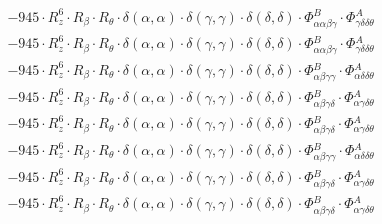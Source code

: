 \documentclass{article}
\begin{document}
\begin{subequations}
\begin{gather}
\begin{array}{c}
 \\[0.2em] 		 - 945 \cdot R_{z}^{6} \cdot R_{\beta{}} \cdot R_{\theta{}} \cdot \delta{}\left(\alpha{}, \alpha{}\right) \cdot \delta{}\left(\gamma{}, \gamma{}\right) \cdot \delta{}\left(\delta{}, \delta{}\right) \cdot \Phi{}^{B}_{\alpha{}\alpha{}\beta{}\gamma{}} \cdot \Phi{}^{A}_{\gamma{}\delta{}\delta{}\theta{}} 
 \\[0.2em] 		 - 945 \cdot R_{z}^{6} \cdot R_{\beta{}} \cdot R_{\theta{}} \cdot \delta{}\left(\alpha{}, \alpha{}\right) \cdot \delta{}\left(\gamma{}, \gamma{}\right) \cdot \delta{}\left(\delta{}, \delta{}\right) \cdot \Phi{}^{B}_{\alpha{}\alpha{}\beta{}\gamma{}} \cdot \Phi{}^{A}_{\gamma{}\delta{}\delta{}\theta{}} 
 \\[0.2em] 		 - 945 \cdot R_{z}^{6} \cdot R_{\beta{}} \cdot R_{\theta{}} \cdot \delta{}\left(\alpha{}, \alpha{}\right) \cdot \delta{}\left(\gamma{}, \gamma{}\right) \cdot \delta{}\left(\delta{}, \delta{}\right) \cdot \Phi{}^{B}_{\alpha{}\beta{}\gamma{}\gamma{}} \cdot \Phi{}^{A}_{\alpha{}\delta{}\delta{}\theta{}} 
 \\[0.2em] 		 - 945 \cdot R_{z}^{6} \cdot R_{\beta{}} \cdot R_{\theta{}} \cdot \delta{}\left(\alpha{}, \alpha{}\right) \cdot \delta{}\left(\gamma{}, \gamma{}\right) \cdot \delta{}\left(\delta{}, \delta{}\right) \cdot \Phi{}^{B}_{\alpha{}\beta{}\gamma{}\delta{}} \cdot \Phi{}^{A}_{\alpha{}\gamma{}\delta{}\theta{}} 
 \\[0.2em] 		 - 945 \cdot R_{z}^{6} \cdot R_{\beta{}} \cdot R_{\theta{}} \cdot \delta{}\left(\alpha{}, \alpha{}\right) \cdot \delta{}\left(\gamma{}, \gamma{}\right) \cdot \delta{}\left(\delta{}, \delta{}\right) \cdot \Phi{}^{B}_{\alpha{}\beta{}\gamma{}\delta{}} \cdot \Phi{}^{A}_{\alpha{}\gamma{}\delta{}\theta{}} 
 \\[0.2em] 		 - 945 \cdot R_{z}^{6} \cdot R_{\beta{}} \cdot R_{\theta{}} \cdot \delta{}\left(\alpha{}, \alpha{}\right) \cdot \delta{}\left(\gamma{}, \gamma{}\right) \cdot \delta{}\left(\delta{}, \delta{}\right) \cdot \Phi{}^{B}_{\alpha{}\beta{}\gamma{}\gamma{}} \cdot \Phi{}^{A}_{\alpha{}\delta{}\delta{}\theta{}} 
 \\[0.2em] 		 - 945 \cdot R_{z}^{6} \cdot R_{\beta{}} \cdot R_{\theta{}} \cdot \delta{}\left(\alpha{}, \alpha{}\right) \cdot \delta{}\left(\gamma{}, \gamma{}\right) \cdot \delta{}\left(\delta{}, \delta{}\right) \cdot \Phi{}^{B}_{\alpha{}\beta{}\gamma{}\delta{}} \cdot \Phi{}^{A}_{\alpha{}\gamma{}\delta{}\theta{}} 
 \\[0.2em] 		 - 945 \cdot R_{z}^{6} \cdot R_{\beta{}} \cdot R_{\theta{}} \cdot \delta{}\left(\alpha{}, \alpha{}\right) \cdot \delta{}\left(\gamma{}, \gamma{}\right) \cdot \delta{}\left(\delta{}, \delta{}\right) \cdot \Phi{}^{B}_{\alpha{}\beta{}\gamma{}\delta{}} \cdot \Phi{}^{A}_{\alpha{}\gamma{}\delta{}\theta{}} 

\end{array}
\end{gather}
\end{subequations}
\end{document}
